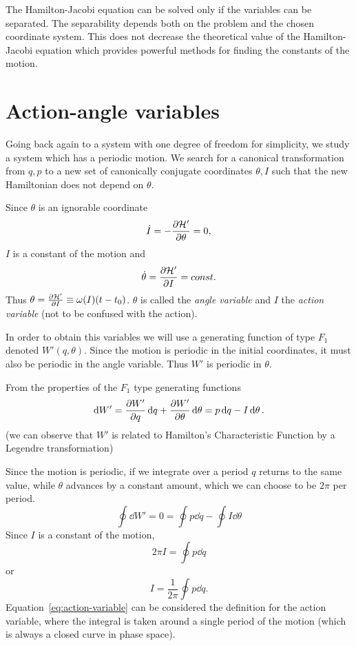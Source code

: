 \documentclass[../thesis.tex]{subfiles}
\theoremstyle{plain}
\begin{document}
The Hamilton-Jacobi equation can be solved only if the variables can be separated.
The separability depends both on the problem and the chosen coordinate system.
This does not decrease the theoretical value of the Hamilton-Jacobi equation which provides
powerful methods for finding the constants of the motion.

\section{Action-angle variables}

Going back again to a system with one degree of freedom for simplicity, we study a system
which has a periodic motion. We search for a canonical transformation from \(q,p\) to
a new set of canonically conjugate coordinates \(\theta, I\) such that the new
Hamiltonian does not depend on \(\theta \).

Since \(\theta \) is an ignorable coordinate
\[
  \dot{I} = -\pdv{\mathcal{H'}}{\theta} = 0,
\]
\(I\) is a constant of the motion and
\[
  \dot{\theta} = \pdv{\mathcal{H'}}{I} = const.
\]
Thus \(\theta = \pdv{\mathcal{H'}}{I} (t-t_0) \equiv \omega(I) (t-t_0)\).
\(\theta \) is called the \emph{angle variable} and \(I\) the \emph{action variable}
(not to be confused with the action).

In order to obtain this variables we will use a generating function of type \(F_1\)
denoted \(W'(q,\theta)\). Since the motion is periodic in the initial coordinates, it
must also be periodic in the angle variable. Thus \(W'\) is periodic in \(\theta \).

From the properties of the \(F_1\) type generating functions
\[
  \dd{W'} = \pdv{W'}{q} \dd{q} + \pdv{W'}{\theta} \dd{\theta} = p \dd{q} - I \dd{\theta}.
\]
(we can observe that \(W'\) is related to Hamilton's Characteristic Function by a
Legendre transformation)

Since the motion is periodic, if we integrate over a period \(q\) returns to the same
value, while \(\theta \) advances by a constant amount, which we can choose to be
\(2\pi \) per period.
\[
  \oint \dd{W'} = 0 = \oint p \dd{q} - \oint I \dd{\theta}
\]
Since \(I\) is a constant of the motion,
\[
  2\pi I = \oint p \dd{q}
\]
or
\begin{equation}
  \label{eq:action-variable}
  I = \frac{1}{2\pi} \oint p \dd{q}.
\end{equation}
Equation~\eqref{eq:action-variable} can be considered the definition for the
action variable, where the integral is taken around a single period of the motion
(which is always a closed curve in phase space).
\end{document}
